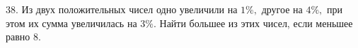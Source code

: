 38. Из двух положительных чисел одно увеличили на $1\%,$ другое на $4\%,$ при этом их сумма увеличилась на $3\%.$ Найти большее из этих чисел, если меньшее равно $8.$\\
